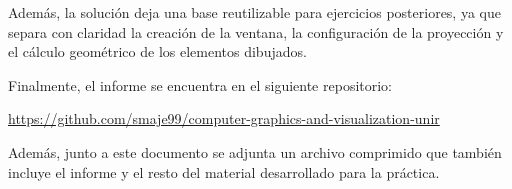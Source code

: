 \documentclass[12pt,a4paper]{article}
\begin{document}
Además, la solución deja una base reutilizable para ejercicios posteriores, ya que separa con claridad la creación de la ventana, la configuración de la proyección y el cálculo geométrico de los elementos dibujados.

Finalmente, el informe se encuentra en el siguiente repositorio:

\href{https://github.com/smaje99/computer-graphics-and-visualization-unir}{https://github.com/smaje99/computer-graphics-and-visualization-unir}

Además, junto a este documento se adjunta un archivo comprimido que también incluye el informe y el resto del material desarrollado para la práctica.
\end{document}
